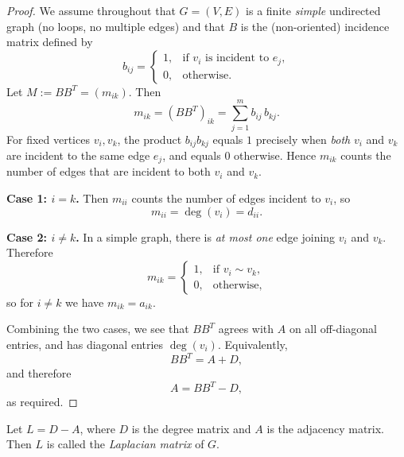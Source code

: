 \documentclass[11pt, a4paper]{ctexrep}
\begin{document}
\begin{proof}
    We assume throughout that $G=(V,E)$ is a finite \emph{simple} undirected graph (no loops, no multiple edges) and that $B$ is the (non-oriented) incidence matrix defined by
    \[
        b_{ij}=
        \begin{cases}
            1, & \text{if } v_i \text{ is incident to } e_j, \\
            0, & \text{otherwise.}
        \end{cases}
    \]
    Let $M:=BB^{T}=(m_{ik})$.  Then
    \[
        m_{ik}=(BB^{T})_{ik}=\sum_{j=1}^{m} b_{ij}\,b_{kj}.
    \]
    For fixed vertices $v_i,v_k$, the product $b_{ij}b_{kj}$ equals $1$ precisely when \emph{both} $v_i$ and $v_k$ are incident to the same edge $e_j$, and equals $0$ otherwise. Hence $m_{ik}$ counts the number of edges that are incident to both $v_i$ and $v_k$.

    \noindent\textbf{Case 1: $i=k$.}
    Then $m_{ii}$ counts the number of edges incident to $v_i$, so
    \[
        m_{ii}=\deg(v_i)=d_{ii}.
    \]

    \noindent\textbf{Case 2: $i\neq k$.}
    In a simple graph, there is \emph{at most one} edge joining $v_i$ and $v_k$. Therefore
    \[
        m_{ik}=
        \begin{cases}
            1, & \text{if } v_i\sim v_k, \\
            0, & \text{otherwise,}
        \end{cases}
    \]
    so for $i\neq k$ we have $m_{ik}=a_{ik}$.

    Combining the two cases, we see that $BB^{T}$ agrees with $A$ on all off-diagonal entries, and has diagonal entries $\deg(v_i)$. Equivalently,
    \[
        BB^{T}=A+D,
    \]
    and therefore
    \[
        A=BB^{T}-D,
    \]
    as required.
\end{proof}

\begin{definition}
    Let $ L = D - A $, where $ D $ is the degree matrix and $ A $ is the adjacency matrix. Then $ L $ is called the \emph{Laplacian matrix} of $ G $.
\end{definition}
\end{document}
